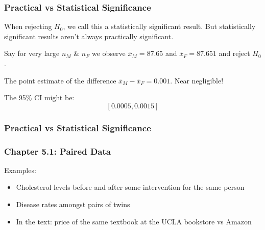 \documentclass[handout]{beamer}
\newcommand{\blue}[1]{\textcolor{blue2}{#1}}
\newcommand{\xbar}{\overline{x}}
\begin{document}


\begin{frame}
\frametitle{Practical vs Statistical Significance}
When rejecting $H_0$, we call this a \blue{statistically significant} result.  But statistically significant results aren't always \blue{practically significant}.

\pause\vspace{0.5cm}

Say for \blue{very} large $n_M$ \& $n_F$ we observe $\xbar_M = 87.65$ and $\xbar_F = 87.651$ and reject $H_0$.  

\pause\vspace{0.5cm}

The point estimate of the difference $\xbar_M - \xbar_F = 0.001$.  Near negligible!  

\pause\vspace{0.5cm}

The 95\% CI might be:
\[
[0.0005, 0.0015]
\]

\end{frame}


\begin{frame}
\frametitle{Practical vs Statistical Significance}

%

\end{frame}


\begin{frame}[fragile]
\frametitle{Chapter 5.1: Paired Data}
%

\pause Examples:

\begin{itemize}
\item Cholesterol levels before and after some intervention for the same person
\pause \item Disease rates amongst pairs of twins
\pause \item In the text:  price of the same textbook at the UCLA bookstore vs Amazon
\end{itemize}

\end{frame}
\end{document}
